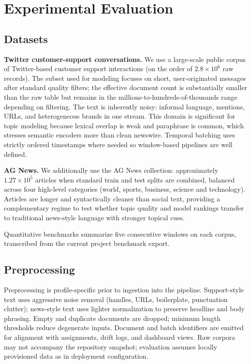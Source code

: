 \documentclass[conference]{IEEEtran}
\begin{document}
\section{Experimental Evaluation}
\subsection{Datasets}
\textbf{Twitter customer-support conversations.} We use a large-scale public corpus of Twitter-based customer support interactions (on the order of $2.8\times10^6$ raw records). The subset used for modeling focuses on short, user-originated messages after standard quality filters; the effective document count is substantially smaller than the raw table but remains in the millions-to-hundreds-of-thousands range depending on filtering. The text is inherently noisy: informal language, mentions, URLs, and heterogeneous brands in one stream. This domain is significant for topic modeling because lexical overlap is weak and paraphrase is common, which stresses semantic encoders more than clean newswire. Temporal batching uses strictly ordered timestamps where needed so window-based pipelines are well defined.

\textbf{AG News.} We additionally use the AG News collection: approximately $1.27\times10^5$ articles when standard train and test splits are combined, balanced across four high-level categories (world, sports, business, science and technology). Articles are longer and syntactically cleaner than social text, providing a complementary regime to test whether topic quality and model rankings transfer to traditional news-style language with stronger topical cues.

Quantitative benchmarks summarize five consecutive windows on each corpus, transcribed from the current project benchmark export.

\subsection{Preprocessing}
Preprocessing is profile-specific prior to ingestion into the pipeline. Support-style text uses aggressive noise removal (handles, URLs, boilerplate, punctuation clutter); news-style text uses lighter normalization to preserve headline and body phrasing. Empty and duplicate documents are dropped; minimum length thresholds reduce degenerate inputs. Document and batch identifiers are emitted for alignment with assignments, drift logs, and dashboard views. Raw corpora may not accompany the repository snapshot; evaluation assumes locally provisioned data as in deployment configuration.
\end{document}
